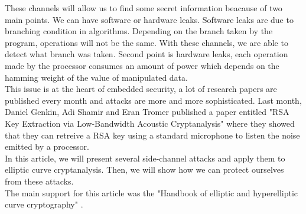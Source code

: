 \documentclass[journal]{IEEEtran}
\begin{document}
These channels will allow us to find some secret information beacause of two main points. We can have software or hardware leaks. Software leaks are due to branching condition in algorithms. Depending on the branch taken by the program, operations will not be the same. With these channels, we are able to detect what branch was taken. Second point is hardware leaks, each operation made by the processor consumes an amount of power which depends on the hamming weight of the value of manipulated data.\\

This issue is at the heart of embedded security, a lot of research papers are published every month and attacks are more and more sophisticated. Last month, Daniel Genkin, Adi Shamir and Eran Tromer published a paper entitled "RSA Key Extraction via Low-Bandwidth Acoustic Cryptanalysis"\cite{genkin2013rsa} where they showed that they can retreive a RSA key using a standard microphone to listen the noise emitted by a processor.\\

In this article, we will present several side-channel attacks and apply them to elliptic curve cryptanalysis. Then, we will show how we can protect ourselves from these attacks.\\

The main support for this article was the "Handbook of elliptic and hyperelliptic curve cryptography" \cite{cohen2010handbook}.






%
%
\end{document}
